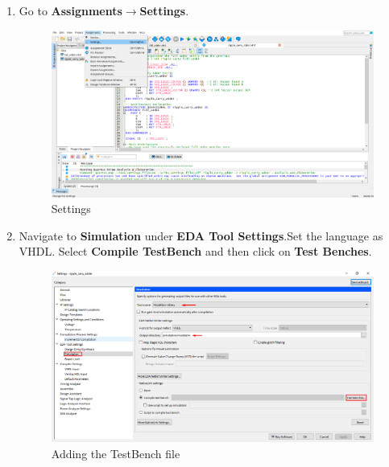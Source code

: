 \documentclass[12pt,singleside,a4paper]{article}
\begin{document}
\begin{enumerate}
    \item Go to \textbf{Assignments}$\rightarrow$\textbf{Settings}.
    \begin{figure}[H]
        \centering
    \includegraphics[width=14cm,keepaspectratio]{img23.png}
    \caption{Settings}
    \end{figure}
    \newpage
    \item Navigate to \textbf{Simulation} under \textbf{EDA Tool Settings}.Set the language as VHDL. Select \textbf{Compile TestBench} and then click on \textbf{Test Benches}.
    \begin{figure}[H]
        \centering
    \includegraphics[width=14cm,keepaspectratio]{img24.png}
    \caption{Adding the TestBench file}
    \end{figure}
  

\end{enumerate}
\end{document}
